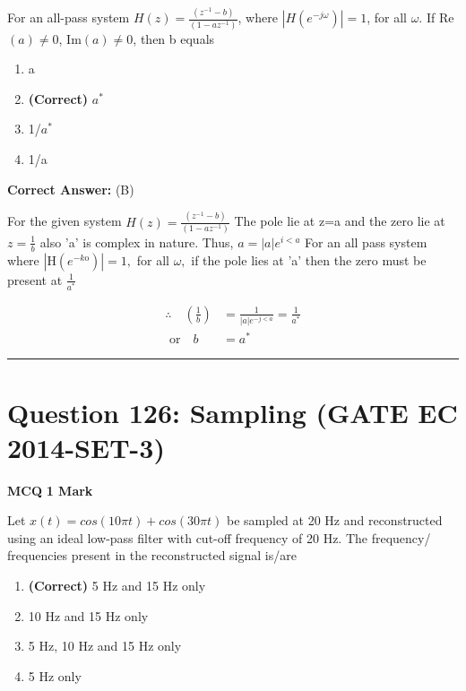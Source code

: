 \documentclass[11pt,a4paper]{article}
\begin{document}
\noindent For an all-pass system $H(z)=\frac{(z^{-1}-b)}{(1-az^{-1})}$, where $|H(e^{-j\omega })|=1$, for all $\omega$. If Re$(a)\neq 0$, Im$(a)\neq 0$, then b equals


\begin{enumerate}[label=(\Alph*)]
    \item a
    \item \textbf{(Correct)} $a^{*}$
    \item 1/$a^{*}$
    \item 1/a
\end{enumerate}

\noindent \textbf{Correct Answer:} (B)

\begin{tcolorbox}[solbox, title=Detailed Solution -- Question 125]
For the given system
$H(z)=\frac{\left(z^{-1}-b\right)}{\left(1-a z^{-1}\right)}$
 The pole lie at z=a and the zero lie at $z=\frac{1}{b}$
 also 'a' is complex in nature.
 Thus, $a=|a| e^{i < a}$
 For an all pass system where $\left|\mathrm{H}\left(e^{-k \mathrm{o}}\right)\right|=1,$ for all $\omega,$ if the pole lies at 'a' then the zero must be present at $\frac{1}{a^{*}}$

\[
\begin{aligned} \therefore \quad\left(\frac{1}{b}\right)&=\frac{1}{|a| e^{-j < a}}=\frac{1}{a^{*}} \\ \text{ or} \quad b&=a^{*} \end{aligned}
\]
\end{tcolorbox}

\vspace{1.5em}
\hrule
\vspace{1.5em}

\section*{Question 126: Sampling (GATE EC 2014-SET-3)}
\noindent \textbf{\color{primary}MCQ} \hfill \textbf{\color{secondary}1 Mark}


\noindent Let $x(t)=cos(10\pi t)+cos(30\pi t)$ be sampled at 20 Hz and reconstructed
using an ideal low-pass filter with cut-off frequency of 20 Hz. The frequency/
frequencies present in the reconstructed signal is/are


\begin{enumerate}[label=(\Alph*)]
    \item \textbf{(Correct)} 5 Hz and 15 Hz only
    \item 10 Hz and 15 Hz only
    \item 5 Hz, 10 Hz and 15 Hz only
    \item 5 Hz only
\end{enumerate}
\end{document}
